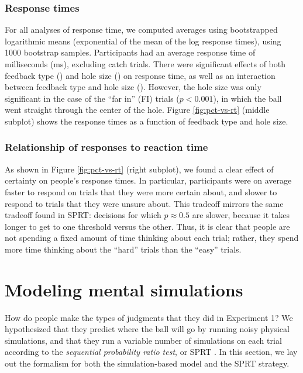 \documentclass[10pt,letterpaper]{article}
\begin{document}
\subsubsection{Response times}

For all analyses of response time, we computed averages using bootstrapped logarithmic means (exponential of the mean of the log response times), using 1000 bootstrap samples. Participants had an average response time of \AvgRT{} milliseconds (\StdRT{}ms), excluding catch trials. There were significant effects of both feedback type (\RTHoleClass{}) and hole size (\RTHoleSize{}) on response time, as well as an interaction between feedback type and hole size (\RTFull{}). However, the hole size was only significant in the case of the ``far in'' (FI) trials ($p<0.001$), in which the ball went straight through the center of the hole. Figure \ref{fig:pct-vs-rt} (middle subplot) shows the response times as a function of feedback type and hole size.

\subsubsection{Relationship of responses to reaction time}

As shown in Figure \ref{fig:pct-vs-rt} (right subplot), we found a clear effect of certainty on people's response times. In particular, participants were on average faster to respond on trials that they were more certain about, and slower to respond to trials that they were unsure about. This tradeoff mirrors the same tradeoff found in SPRT: decisions for which $p\approx0.5$ are slower, because it takes longer to get to one threshold versus the other. Thus, it is clear that people are not spending a fixed amount of time thinking about each trial; rather, they spend more time thinking about the ``hard'' trials than the ``easy'' trials.

\section{Modeling mental simulations}

How do people make the types of judgments that they did in Experiment 1? We hypothesized that they predict where the ball will go by running noisy physical simulations, and that they run a variable number of simulations on each trial according to the \textit{sequential probability ratio test}, or SPRT \cite{wald1947sequential}. In this section, we lay out the formalism for both the simulation-based model and the SPRT strategy.
\end{document}

